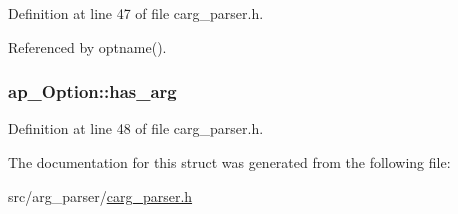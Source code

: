 Definition at line 47 of file carg\_\-parser.h.



Referenced by optname().

\hypertarget{structap__Option_ae03ec6e8ecabc2ac71c229cb995d2b2f}{
\subsubsection[{has\_\-arg}]{ {\bf ap\_\-Option::has\_\-arg}}}
\label{d1/d64/structap__Option_ae03ec6e8ecabc2ac71c229cb995d2b2f}


Definition at line 48 of file carg\_\-parser.h.



The documentation for this struct was generated from the following file:\begin{DoxyCompactItemize}
\item 
src/arg\_\-parser/\hyperlink{carg__parser_8h}{carg\_\-parser.h}\end{DoxyCompactItemize}
